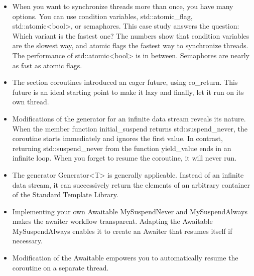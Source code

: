 \begin{tcolorbox}[breakable,enhanced jigsaw,colback=mygreen!5!white,colframe=mygreen!75!black,title={Distilled Information}]
	
\begin{itemize}
\item 
When you want to synchronize threads more than once, you have many options. You can use condition variables, std::atomic\_flag, std::atomic<bool>, or semaphores. This case study answers the question: Which variant is the fastest one? The numbers show that condition variables are the slowest way, and atomic flags the fastest way to synchronize threads. The performance of std::atomic<bool> is in between. Semaphores are nearly as fast as atomic flags.

\item 
The section coroutines introduced an eager future, using co\_return. This future is an ideal starting point to make it lazy and finally, let it run on its own thread.

\item 
Modifications of the generator for an infinite data stream reveals its nature. When the member function initial\_suspend returns std::suspend\_never, the coroutine starts immediately and ignores the first value. In contrast, returning std::suspend\_never from the function yield\_value ends in an infinite loop. When you forget to resume the coroutine, it will never run.

\item 
The generator Generator<T> is generally applicable. Instead of an infinite data stream, it can successively return the elements of an arbitrary container of the Standard Template Library.

\item 
Implementing your own Awaitable MySuspendNever and MySuspendAlways makes the awaiter workflow transparent. Adapting the Awaitable MySuspendAlways enables it to create an Awaiter that resumes itself if necessary.

\item 
Modification of the Awaitable empowers you to automatically resume the coroutine on a separate thread.
\end{itemize}
	
\end{tcolorbox}




















